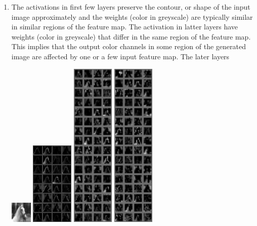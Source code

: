 \documentclass[11pt]{article}
\begin{document}
\begin{enumerate}
    \item The activations in first few layers preserve the contour, or shape of the input image approximately and the weights (color in greyscale) are typically similar in similar regions of the feature map. The activation in latter layers have weights (color in greyscale) that differ in the same region of the feature map. This implies that the output color channels in some region of the generated image are affected by one or a few input feature map. The later layers 
    \begin{center}
        \includegraphics[width=1cm]{act1_cnn/filter_input_1.png}
        \includegraphics[width=2cm]{act1_cnn/filter_out0_1.png}
        \includegraphics[width=2cm]{act1_cnn/filter_out1_1.png}
        \includegraphics[width=2cm]{act1_cnn/filter_out2_1.png}

\end{center}
\end{enumerate}
\end{document}
